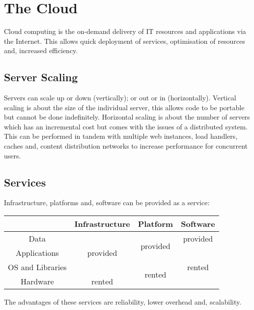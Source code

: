 \section{The Cloud}

Cloud computing is the on-demand delivery of IT resources and applications via the
Internet. This allows quick deployment of services, optimisation of resources and,
increased efficiency.

\subsection{Server Scaling}

Servers can scale up or down (vertically); or out or in (horizontally).
Vertical scaling is about the size of the individual server, this allows code to be
portable but cannot be done indefinitely. Horizontal scaling is about the number of
servers which has an incremental cost but comes with the issues of a distributed system.
\\[\baselineskip]
This can be performed in tandem with multiple web instances, load handlers, caches and, 
content distribution networks to increase performance for concurrent users.

\subsection{Services}

Infrastructure, platforms and, software can be provided as a service:
\begin{center}
    \begin{tabular}{ c | c | c | c | }
        \cline{2-4}
                         & Infrastructure            & Platform                  & Software \\
        \cline{2-4}
        \hline
        \multicolumn{1}{|c|}{Data}             & \multirow{3}{*}{provided} & \multirow{2}{*}{provided} & provided \\
        \cline{1-1} \cline{4-4}
        \multicolumn{1}{|c|}{Applications}     &                           &                           & \multirow{3}{*}{rented} \\
        \cline{1-1} \cline{3-3}
        \multicolumn{1}{|c|}{OS and Libraries} &                           & \multirow{2}{*}{rented}   & \\
        \cline{1-1} \cline{2-2}
        \multicolumn{1}{|c|}{Hardware}         & rented                    &                           & \\
        \hline
    \end{tabular}
\end{center} The advantages of these services are reliability, lower overhead and,
scalability.

